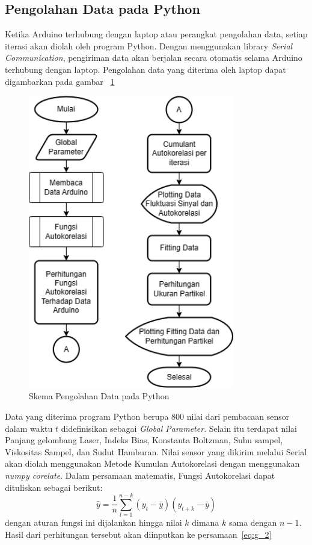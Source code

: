 \subsection{Pengolahan Data pada Python}
Ketika Arduino terhubung dengan laptop atau perangkat pengolahan data, setiap iterasi akan diolah
oleh program Python. Dengan menggunakan library \textit{Serial Communication}, pengiriman data
akan berjalan secara otomatis selama Arduino terhubung dengan laptop. Pengolahan data yang
diterima oleh laptop dapat digambarkan pada gambar ~\ref{fig:schemapy}

\begin{figure}[H]
    \centering
    \includegraphics[width=9cm]{Images/Skema Python.png}
    \caption{Skema Pengolahan Data pada Python}
    \label{fig:schemapy}
\end{figure}

Data yang diterima program Python berupa 800 nilai dari pembacaan sensor dalam waktu ${t}$
didefinisikan sebagai \textit{Global Parameter}. Selain itu terdapat nilai Panjang gelombang
Laser, Indeks Bias, Konstanta Boltzman, Suhu sampel, Viskositas Sampel, dan Sudut Hamburan.
Nilai sensor yang dikirim melalui Serial akan diolah menggunakan Metode Kumulan Autokorelasi
dengan menggunakan \textit{numpy corelate}. Dalam persamaan matematis, Fungsi Autokorelasi
dapat dituliskan sebagai berikut:
\begin{equation}
    \hat{y} = \frac{1}{n} \sum_{t=1}^{n-k}\left(y_t - \bar{y}\right)\left(y_{t+k} - \bar{y}\right)
\end{equation}
\noindent
dengan aturan fungsi ini dijalankan hingga nilai ${k}$ dimana ${k}$ sama dengan ${n-1}$.
Hasil dari perhitungan tersebut akan diinputkan ke persamaan~\ref{eq:g_2}

